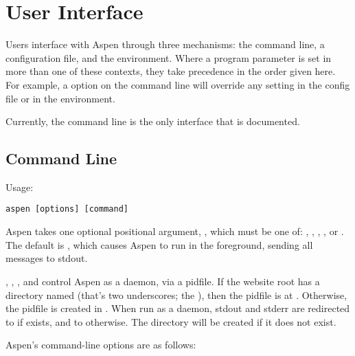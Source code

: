 \chapter{User Interface \label{interface}}

Users interface with Aspen through three mechanisms: the command line, a
configuration file, and the environment. Where a program parameter is set in
more than one of these contexts, they take precedence in the order given here.
For example, a  option on the command line will override any
 setting in the config file or in the environment.

Currently, the command line is the only interface that is documented.


\section{Command Line \label{command-line}}

Usage:

\begin{verbatim}
aspen [options] [command]
\end{verbatim}

Aspen takes one optional positional argument, , which must be one
of: , , , , or .
The default is , which causes Aspen to run in the foreground,
sending all messages to stdout.

, , , and  control Aspen as a
daemon, via a pidfile. If the website root has a directory named \file{__}
(that's two underscores; the ), then the pidfile is at
. Otherwise, the pidfile is created in . When
run as a daemon, stdout and stderr are redirected to  if
\file{__} exists, and to  otherwise. The  directory
will be created if it does not exist.

Aspen's command-line options are as follows:

